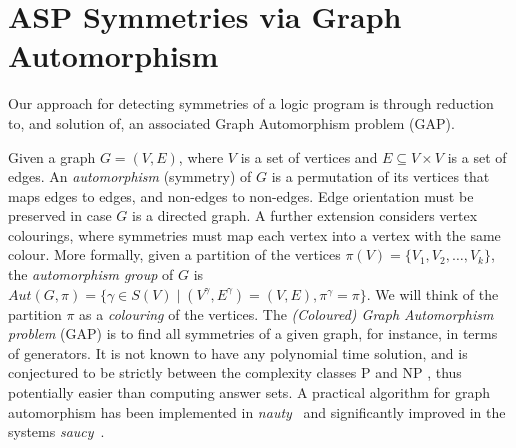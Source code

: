 \documentclass[envcountsame]{llncs}
\newcommand{\systemname}[1]{\emph{#1}}
\begin{document}
\section{ASP Symmetries via Graph Automorphism \label{sec:sd}}
Our approach for detecting symmetries of a logic program is through reduction to, and solution of, an associated Graph Automorphism problem (GAP).

Given a graph $G = (V,E)$, where $V$ is a set of vertices and $E \subseteq V \times V$ is a set of edges. An \emph{automorphism} (symmetry) of $G$ is a permutation of its vertices that maps edges to edges, and non-edges to non-edges. Edge orientation must be preserved in case $G$ is a directed graph. A further extension considers vertex colourings, where symmetries must map each vertex into a vertex with the same colour. More formally, given a partition of the vertices $\pi(V) = \{V_1, V_2, \dots, V_k\}$, the \emph{automorphism group} of $G$ \cite{mc81a} is $Aut(G,\pi) = \{ \gamma \in S(V) \mid (V^\gamma, E^\gamma) = (V,E) , \pi^\gamma = \pi\}$. We will think of the partition $\pi$ as a \emph{colouring} of the vertices.
The \emph{(Coloured) Graph Automorphism problem} (GAP) is to find all symmetries of a given graph, for instance, in terms of generators. It is not known to have any polynomial time solution, and is conjectured to be strictly between the complexity classes P and NP \cite{ba95a}, thus potentially easier than computing answer sets. A practical algorithm for graph automorphism has been implemented in \systemname{nauty}~\cite{mc81a} and significantly improved in the systems \systemname{saucy}~\cite{dalisama04a,dasakama08a}.
\end{document}
